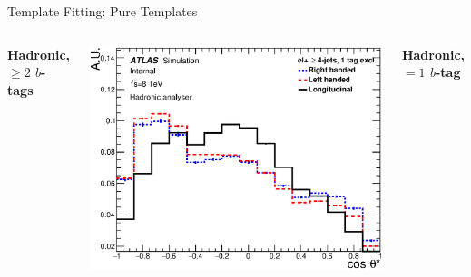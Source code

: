 \documentclass{beamer}
\begin{document}
{\begin{frame}{Template Fitting: Pure Templates}
{\begin{columns}
        \textbf{Hadronic, $\geq2$ $b$-tags}
        \begin{center}\includegraphics[width=1.16\textwidth]{../chapters/whel/figures/templatePlots/Hadronic/Signal_Templates_1excl_el_had}\end{center}\vspace{-15pt}\centering\tiny
        \textbf{Hadronic, $=1$ $b$-tag}
      \end{columns}
    }
  \end{frame}


}
\end{document}
